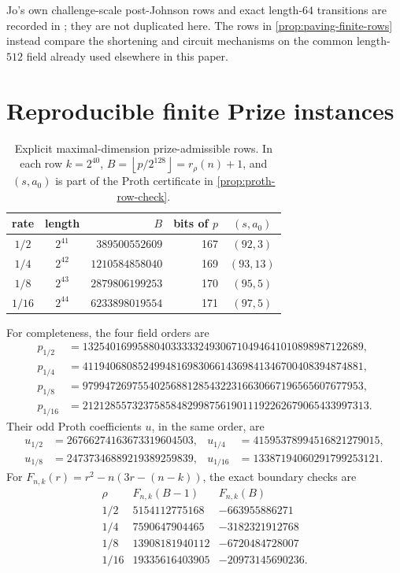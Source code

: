 \documentclass[11pt,a4paper]{amsart}
\numberwithin{equation}{section}
\theoremstyle{remark}
\newcommand{\floor}[1]{\left\lfloor #1\right\rfloor}
\begin{document}
Jo's own challenge-scale post-Johnson rows and exact length-\(64\)
transitions are recorded in \cite[Thms.~5.1--5.2]{Jo26}; they are not
duplicated here.  The rows in \cref{prop:paving-finite-rows} instead compare
the shortening and circuit mechanisms on the common length-\(512\) field
already used elsewhere in this paper.

\section{Reproducible finite Prize instances}\label{sec:prize-rows}

\begin{table}[H]
\centering
\caption{Explicit maximal-dimension prize-admissible rows.  In each row
\(k=2^{40}\), \(B=\floor{p/2^{128}}=r_\rho(n)+1\), and \((s,a_0)\) is part of
the Proth certificate in \cref{prop:proth-row-check}.}
\label{tab:prize-proth-rows}
\small
\begin{tabular}{@{}ccrrc@{}}
\hline
rate & length & \(B\) & bits of \(p\) & \((s,a_0)\)\\
\hline
\(1/2\)  & \(2^{41}\) & \(389500552609\)  & 167 & \((92,3)\)\\
\(1/4\)  & \(2^{42}\) & \(1210584858040\) & 169 & \((93,13)\)\\
\(1/8\)  & \(2^{43}\) & \(2879806199253\) & 170 & \((95,5)\)\\
\(1/16\) & \(2^{44}\) & \(6233898019554\) & 171 & \((97,5)\)\\
\hline
\end{tabular}
\end{table}

For completeness, the four field orders are
\begin{align*}
p_{1/2}&=132540169958804033333249306710494641010898987122689,\\
p_{1/4}&=411940680852499481698306614369841346700408394874881,\\
p_{1/8}&=979947269755402568812854322316630667196565607677953,\\
p_{1/16}&=2121285573237585848299875619011192262679065433997313.
\end{align*}
Their odd Proth coefficients \(u\), in the same order, are
\begin{align*}
u_{1/2}&=26766274163673319604503,
&u_{1/4}&=41595378994516821279015,\\
u_{1/8}&=24737346889219389259839,
&u_{1/16}&=13387194060291799253121.
\end{align*}
For \(F_{n,k}(r)=r^2-n(3r-(n-k))\), the exact boundary checks are
\[
\begin{array}{c|r|r}
 \rho&F_{n,k}(B-1)&F_{n,k}(B)\\ \hline
 1/2&5154112775168&-663955886271\\
 1/4&7590647904465&-3182321912768\\
 1/8&13908181940112&-6720484728007\\
 1/16&19335616403905&-20973145690236.
\end{array}                                                    \tag{PC0}
\label{eq:quadratic-row-certificates}
\]
\end{document}
